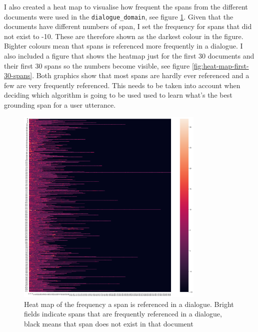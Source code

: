 \documentclass[11pt]{article}
\begin{document}
    I also created a heat map to visualise how frequent the spans from the different documents were used in the \texttt{dialogue\_domain},
    see figure \ref{fig:heat-map-all-spans}. Given that the documents have different numbers of span, I set the frequency for spans that did not exist to -10. These
    are therefore shown as the darkest colour in the figure. Bighter colours mean that spans is referenced more frequently in a
    dialogue. I also included a figure that shows the heatmap just for the first 30 documents and their first 30 spans
    so the numbers become visible, see figure \ref{fig:heat-map-first-30-spans}. Both graphics show that most spans
    are hardly ever referenced and a few are very frequently referenced. This needs to be taken into account when
    deciding which algorithm is going to be used used to learn what's the best grounding span for a user utterance.

    \begin{figure}[h]
        \centering
        \includegraphics[width=0.8\textwidth]{sparsity_of_spans}
        \caption{Heat map of the frequency a span is referenced in a dialogue. Bright fields indicate spans that are frequently
        referenced in a dialogue, black means that span does not exist in that document}
        \label{fig:heat-map-all-spans}
    \end{figure}
\end{document}
